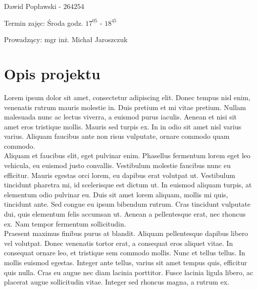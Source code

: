 \documentclass{report}
\begin{document}
\begin{titlepage}
\begin{center}
{			}
		\end{center}
		
		\vspace*{2cm}
		
		\begin{flushright}
			{
				Dawid Popławski - $264254$
				
				Termin zajęc: Środa godz. $17^{\underline{05}}$ - $18^{\underline{45}}$ 
				
				Prowadzący: mgr inż. Michał Jaroszczuk
				
			}
			
		\end{flushright}
		
		\vfill
		
\end{titlepage}

\tableofcontents
\chapter{Opis projektu}
Lorem ipsum dolor sit amet, consectetur adipiscing elit. Donec tempus nisl enim, venenatis rutrum mauris molestie in. Duis pretium et mi vitae pretium. Nullam malesuada nunc ac lectus viverra, a euismod purus iaculis. Aenean et nisi sit amet eros tristique mollis. Mauris sed turpis ex. In in odio sit amet nisl varius varius. Aliquam faucibus ante non risus vulputate, ornare commodo quam commodo.\\

Aliquam et faucibus elit, eget pulvinar enim. Phasellus fermentum lorem eget leo vehicula, eu euismod justo convallis. Vestibulum molestie faucibus nunc eu efficitur. Mauris egestas orci lorem, eu dapibus erat volutpat ut. Vestibulum tincidunt pharetra mi, id scelerisque est dictum ut. In euismod aliquam turpis, at elementum odio pulvinar eu. Duis sit amet lorem aliquam, mollis mi quis, tincidunt ante. Sed congue eu ipsum bibendum rutrum. Cras tincidunt vulputate dui, quis elementum felis accumsan ut. Aenean a pellentesque erat, nec rhoncus ex. Nam tempor fermentum sollicitudin.\\

Praesent maximus finibus purus at blandit. Aliquam pellentesque dapibus libero vel volutpat. Donec venenatis tortor erat, a consequat eros aliquet vitae. In consequat ornare leo, et tristique sem commodo mollis. Nunc et tellus tellus. In mollis euismod egestas. Integer ante tellus, varius sit amet tempus quis, efficitur quis nulla. Cras eu augue nec diam lacinia porttitor. Fusce lacinia ligula libero, ac placerat augue sollicitudin vitae. Integer sed rhoncus magna, a rutrum ex.
\end{document}
